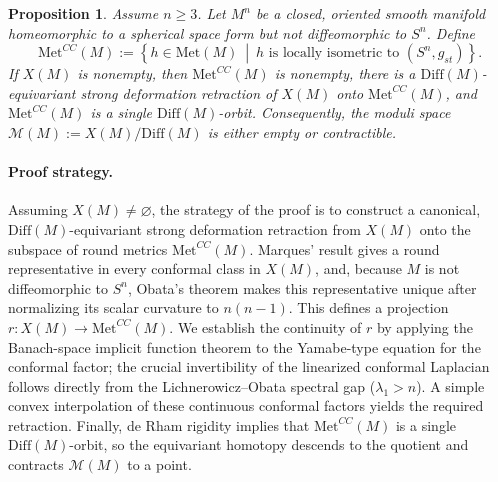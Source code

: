 \documentclass[12pt,oneside,a4paper]{article}
\newtheorem{proposition}[definition]{Proposition}
\theoremstyle{mytheorem}
\theoremstyle{remark}
\theoremstyle{definition}
\begin{document}
\begin{proposition}\label{spherical space}
Assume $n\geq3$. Let $M^n$ be a closed, oriented smooth manifold homeomorphic
to a spherical space form but not diffeomorphic to $S^n$. Define
\[
\mathrm{Met}^{CC}(M)
:=
\left\{
h\in\mathrm{Met}(M)
\ \middle|\ 
h\text{ is locally isometric to }(S^n,g_{st})
\right\}.
\]
If $X(M)$ is nonempty, then $\mathrm{Met}^{CC}(M)$ is nonempty, there is a
$\mathrm{Diff}(M)$-equivariant strong deformation retraction of $X(M)$ onto
$\mathrm{Met}^{CC}(M)$, and $\mathrm{Met}^{CC}(M)$ is a single
$\mathrm{Diff}(M)$-orbit. Consequently, the moduli space
\(
\mathcal{M}(M):=X(M)/\mathrm{Diff}(M)
\)
is either empty or contractible.
\end{proposition}




\paragraph*{Proof strategy.}
Assuming $X(M)\neq\varnothing$, the strategy of the proof is to construct a
canonical, $\mathrm{Diff}(M)$-equivariant strong deformation retraction from
$X(M)$ onto the subspace of round metrics $\mathrm{Met}^{CC}(M)$. Marques'
result \cite[Corollary~3.2]{MR2950765} gives a round representative in every
conformal class in $X(M)$, and, because $M$ is not diffeomorphic to $S^n$,
Obata's theorem \cite{zbMATH03374588} makes this representative unique after
normalizing its scalar curvature to $n(n-1)$. This defines a projection
$r\colon X(M)\to\mathrm{Met}^{CC}(M)$. We establish the continuity of $r$ by
applying the Banach-space implicit function theorem to the Yamabe-type equation
for the conformal factor; the crucial invertibility of the linearized conformal
Laplacian follows directly from the Lichnerowicz--Obata spectral gap
($\lambda_1>n$). A simple convex interpolation of these continuous conformal
factors yields the required retraction. Finally, de Rham rigidity implies that
$\mathrm{Met}^{CC}(M)$ is a single $\mathrm{Diff}(M)$-orbit, so the equivariant
homotopy descends to the quotient and contracts $\mathcal{M}(M)$ to a point.
\end{document}

